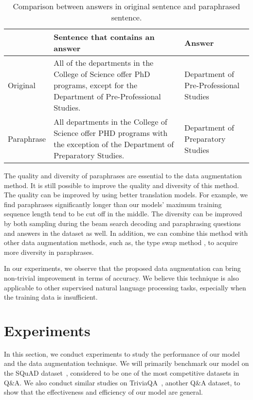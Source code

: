 \documentclass{article} \usepackage{iclr2018_conference,times}
\begin{document}
\begin{table}[ht]
\small
\begin{center}
\begin{tabular}{l|p{7.5cm}|p{3.5cm}}
\hline
&Sentence that contains an answer & Answer \\\hline
Original& All of the departments in the College of Science offer PhD programs, except for the Department of Pre-Professional Studies.  & Department of Pre-Professional Studies\\\hline
Paraphrase& All departments in the College of Science offer PHD programs with the exception of the Department of Preparatory Studies. & Department of Preparatory Studies 
\\\hline
\end{tabular}
\end{center}
\caption{Comparison between answers in original sentence and paraphrased sentence.}
\label{table:augmentation_answer}
\end{table}

The quality and diversity of paraphrases are essential to the data augmentation method. It is still possible to improve the quality and diversity of this method. The quality can be improved by using better translation models. For example, we find paraphrases significantly longer than our models' maximum training sequence length tend to be cut off in the middle. The diversity can be improved by both sampling during the beam search decoding and paraphrasing questions and answers in the dataset as well. In addition, we can combine this method with other data augmentation methods, such as, the type swap method \citep{RaimanM17}, to acquire more diversity in paraphrases.

In our experiments, we observe that the proposed data augmentation can bring non-trivial improvement in terms of accuracy. We believe this technique is also applicable to other supervised natural language processing tasks, especially when the training data is insufficient.
 \section{Experiments}\label{sec:experiment}

In this section, we conduct experiments to study the performance of our model and the data augmentation technique. We will primarily benchmark our model on the SQuAD dataset~\citep{RajpurkarZLL16}, considered to be one of the most competitive datasets in Q\&A. We also conduct similar studies on  TriviaQA~\citep{JoshiCWZ17}, another Q\&A dataset, to show that the effectiveness and efficiency of our model are general.
\end{document}
